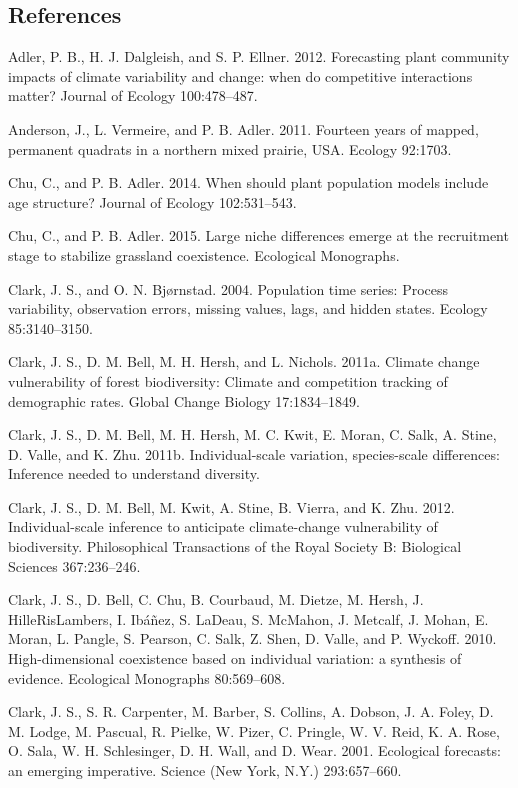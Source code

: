 \documentclass[12pt,]{article}
\begin{document}
\subsection{References}\label{references}

Adler, P. B., H. J. Dalgleish, and S. P. Ellner. 2012. Forecasting plant
community impacts of climate variability and change: when do competitive
interactions matter? Journal of Ecology 100:478--487.

Anderson, J., L. Vermeire, and P. B. Adler. 2011. Fourteen years of
mapped, permanent quadrats in a northern mixed prairie, USA. Ecology
92:1703.

Chu, C., and P. B. Adler. 2014. When should plant population models
include age structure? Journal of Ecology 102:531--543.

Chu, C., and P. B. Adler. 2015. Large niche differences emerge at the
recruitment stage to stabilize grassland coexistence. Ecological
Monographs.

Clark, J. S., and O. N. Bjørnstad. 2004. Population time series: Process
variability, observation errors, missing values, lags, and hidden
states. Ecology 85:3140--3150.

Clark, J. S., D. M. Bell, M. H. Hersh, and L. Nichols. 2011a. Climate
change vulnerability of forest biodiversity: Climate and competition
tracking of demographic rates. Global Change Biology 17:1834--1849.

Clark, J. S., D. M. Bell, M. H. Hersh, M. C. Kwit, E. Moran, C. Salk, A.
Stine, D. Valle, and K. Zhu. 2011b. Individual-scale variation,
species-scale differences: Inference needed to understand diversity.

Clark, J. S., D. M. Bell, M. Kwit, A. Stine, B. Vierra, and K. Zhu.
2012. Individual-scale inference to anticipate climate-change
vulnerability of biodiversity. Philosophical Transactions of the Royal
Society B: Biological Sciences 367:236--246.

Clark, J. S., D. Bell, C. Chu, B. Courbaud, M. Dietze, M. Hersh, J.
HilleRisLambers, I. Ibáñez, S. LaDeau, S. McMahon, J. Metcalf, J. Mohan,
E. Moran, L. Pangle, S. Pearson, C. Salk, Z. Shen, D. Valle, and P.
Wyckoff. 2010. High-dimensional coexistence based on individual
variation: a synthesis of evidence. Ecological Monographs 80:569--608.

Clark, J. S., S. R. Carpenter, M. Barber, S. Collins, A. Dobson, J. A.
Foley, D. M. Lodge, M. Pascual, R. Pielke, W. Pizer, C. Pringle, W. V.
Reid, K. A. Rose, O. Sala, W. H. Schlesinger, D. H. Wall, and D. Wear.
2001. Ecological forecasts: an emerging imperative. Science (New York,
N.Y.) 293:657--660.
\end{document}
